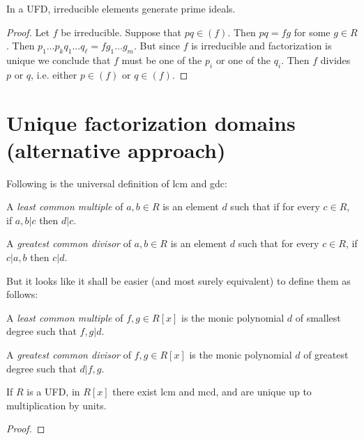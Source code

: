 \begin{lemma}
\label{lemma-in-UFD-irreducible-elements-generate-prime-ideals}
In a UFD, irreducible elements generate prime ideals.
\end{lemma}

\begin{proof}
Let $f$ be irreducible. Suppose that $pq\in(f)$. Then $pq=fg$ for some  $g\in
R$. Then $p_1\ldots p_kq_1\ldots q_\ell=fg_1\ldots g_m$. But since $f$ is
irreducible and factorization is unique we conclude that $f$ must be one of the
 $p_i$ or one of the $q_i$. Then $f$ divides $p$ or $q$, i.e. either $p\in(f)$
or $q\in(f)$.
\end{proof}

\section{Unique factorization domains (alternative approach)}
\label{section-UFD-alternative}


Following is the universal definition of lcm and gdc:

\begin{definition}
\label{definition-lcm-and-gdc-universal}
A {\it least common multiple} of $a,b \in R$ is an element $d$ such that if for
every $c\in R$, if $a,b|c$ then $d|c$.

A {\it greatest common divisor} of $a,b \in R$ is an element $d$ such that
for every  $c \in R$,  if $c|a,b$ then  $c|d$.
\end{definition}

But it looks like it shall be easier (and most surely equivalent) to define them
as follows:

\begin{definition}
\label{definition-lcm-and-gdc-polynomial}
A {\it least common multiple} of $f,g \in R[x]$ is the monic polynomial $d$ of
smallest degree such that $f,g|d$.

A {\it greatest common divisor} of $f,g\in R[x]$ is the monic polynomial $d$ of
greatest degree such that $d|f,g$.
\end{definition}

\begin{lemma}
\label{lemma-existence-of-lcm-and-gcd}
If $R$ is a UFD, in $R[x]$ there exist lcm and mcd, and are unique up to 
multiplication by units.
\end{lemma}

\begin{proof}

\end{proof}

